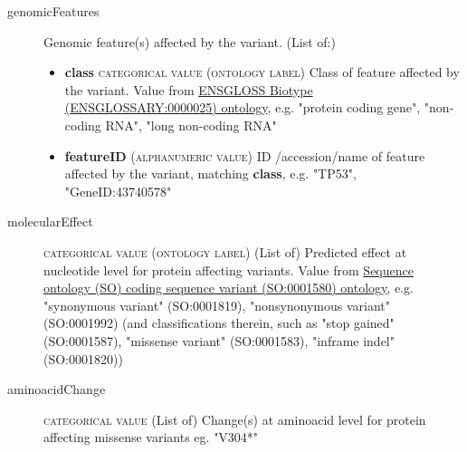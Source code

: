 \documentclass[a4paper, 10pt]{article}        %
\begin{document}
\begin{description}
	\item[genomicFeatures] Genomic feature(s) affected by the variant. (List of:)
	\begin{itemize}
			\item[]  \textbf{class} {\textsc{categorical value (ontology label)}} Class of feature affected by the variant. Value from \href{http://ensembl.org/glossary/ENSGLOSSARY_0000025}{ENSGLOSS Biotype (ENSGLOSSARY:0000025) ontology}, e.g. "protein coding gene", "non-coding RNA", "long non-coding RNA"
			\item[]  \textbf{featureID} {\textsc{(alphanumeric value)}} ID /accession/name of feature affected by the variant, matching \textbf{class}, e.g. "TP53", "GeneID:43740578"
	\end{itemize} 
	\item[molecularEffect] {\textsc{categorical value (ontology label)}} (List of) Predicted effect at nucleotide level for protein affecting variants. Value from \href{http://purl.obolibrary.org/obo/SO_0001580}{Sequence ontology (SO) coding sequence variant (SO:0001580) ontology}, e.g. "synonymous variant" (SO:0001819), "nonsynonymous variant" (SO:0001992) (and classifications therein, such as "stop gained" (SO:0001587), "missense variant" (SO:0001583), "inframe indel" (SO:0001820))
	\item[aminoacidChange]  {\textsc{categorical value}} (List of) Change(s) at aminoacid level for protein affecting missense variants eg. "V304*"
	
 \end{description}



\end{document}
